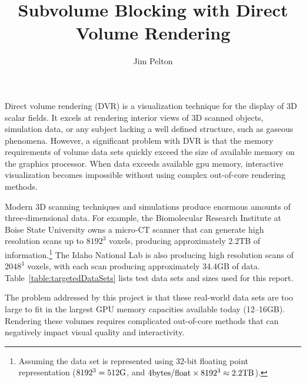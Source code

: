 \documentclass[journal]{vgtc}                %
\title{Subvolume Blocking with Direct Volume Rendering}
\author{Jim Pelton}
\begin{document}


\maketitle

Direct volume rendering (DVR) is a visualization technique for the display of
3D scalar fields. It excels at rendering interior views of 3D scanned
objects, simulation data, or any subject lacking a well defined structure, such
as gaseous phenomena. However, a significant problem with DVR is that the
memory requirements of volume data sets quickly exceed the size of available
memory on the graphics processor.  When data exceeds available gpu memory, 
interactive visualization becomes impossible without using complex out-of-core 
rendering methods. 

Modern 3D scanning techniques and simulations produce enormous amounts of
three-dimensional data.  For example, the Biomolecular Research Institute at
Boise State University owns a micro-CT scanner that can generate high
resolution scans up to $8192^3$ voxels, producing approximately 2.2TB of
information.\footnote{Assuming the data set is represented using 32-bit
	floating point representation 
	($8192^3 = 512\textnormal{G}$, 
	and $4\textnormal{bytes/float} \times 8192^3 \approx 2.2\textnormal{TB}$).} 
The Idaho National Lab is also producing
high resolution scans of $2048^3$ voxels,
with each scan producing approximately 34.4GB of data.
Table~\ref{table:targetedDataSets} lists test data sets and sizes used for this
report.

The problem addressed by this project is that these real-world data sets are
too large to fit in the largest GPU memory capacities available today
(12--16GB).  Rendering these volumes requires complicated out-of-core methods that can
negatively impact visual quality and interactivity.  
\end{document}
